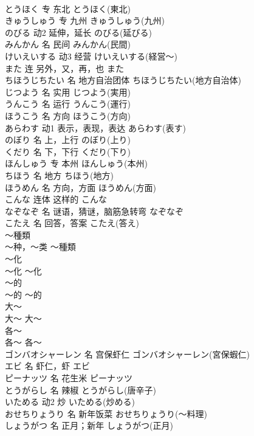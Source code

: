 \documentclass[8pt]{extreport}
\begin{document}
\begin{CJK}{UTF8}{min}
\\	とうほく	专	东北	とうほく(東北)	
\\	きゅうしゅう	专	九州	きゅうしゅう(九州)	
\\	のびる	动2	延伸，延长	のびる(延びる)	
\\	みんかん	名	民间	みんかん(民間)	
\\	けいえいする	动3	经营	けいえいする(経営～)	
\\	また	连	另外，又，再，也	また	
\\	ちほうじちたい	名	地方自治团体	ちほうじちたい(地方自治体)	
\\	じつよう	名	实用	じつよう(実用)	
\\	うんこう	名	运行	うんこう(運行)	
\\	ほうこう	名	方向	ほうこう(方向)	
\\	あらわす	动1	表示，表现，表达	あらわす(表す)	
\\	のぼり	名	上，上行	のぼり(上り)	
\\	くだり	名	下，下行	くだり(下り)	
\\	ほんしゅう	专	本州	ほんしゅう(本州)	
\\	ちほう	名	地方	ちほう(地方)	
\\	ほうめん	名	方向，方面	ほうめん(方面)	
\\	こんな	连体	这样的	こんな	
\\	なぞなぞ	名	谜语，猜谜，脑筋急转弯	なぞなぞ	
\\	こたえ	名	回答，答案	こたえ(答え)	
\\	～種類	
\\	～种，～类	～種類	
\\	～化	
\\	～化	～化	
\\	～的	
\\	～的	～的	
\\	大～	
\\	大～	大～	
\\	各～	
\\	各～	各～	
\\	ゴンバオシャーレン	名	宫保虾仁	ゴンバオシャーレン(宮保蝦仁)	
\\	エビ	名	虾仁，虾	エビ	
\\	ピーナッツ	名	花生米	ピーナッツ	
\\	とうがらし	名	辣椒	とうがらし(唐辛子)	
\\	いためる	动2	炒	いためる(炒める)	
\\	おせちりょうり	名	新年饭菜	おせちりょうり(～料理)	
\\	しょうがつ	名	正月；新年	しょうがつ(正月)	

\end{CJK}
\end{document}
